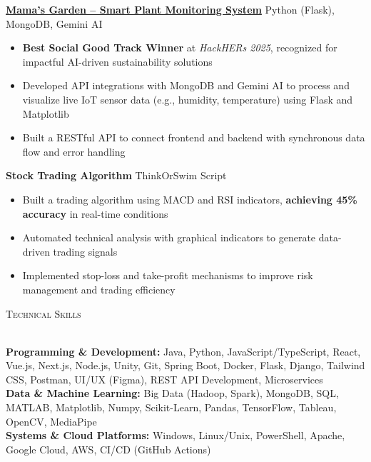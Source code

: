 \documentclass[a4paper]{article}
\newcommand{\lineunder} {
    \vspace*{-8pt} \\
    \hspace*{-18pt} \hrulefill \\
}
\newcommand{\header} [1] {
    {\hspace*{-18pt}\vspace*{6pt} \textsc{#1}}
    \vspace*{-6pt} \lineunder
}
\begin{document}
\textbf{\href{https://devpost.com/software/mama-s-garden}{Mama's Garden – Smart Plant Monitoring System}} \hfill Python (Flask), MongoDB, Gemini AI  
\vspace{-3mm}
\begin{itemize} \itemsep -4pt
    \item \textbf{Best Social Good Track Winner} at \textit{HackHERs 2025}, recognized for impactful AI-driven sustainability solutions
    \item Developed API integrations with MongoDB and Gemini AI to process and visualize live IoT sensor data (e.g., humidity, temperature) using Flask and Matplotlib
    \item Built a RESTful API to connect frontend and backend with synchronous data flow and error handling
\end{itemize}
\vspace{-1mm}

\textbf{{Stock Trading Algorithm}}  \hfill ThinkOrSwim Script \\
\vspace{-3mm}
\begin{itemize} \itemsep -4pt
  \item Built a trading algorithm using MACD and RSI indicators, \textbf{achieving 45\% accuracy} in real-time conditions
  \item Automated technical analysis with graphical indicators to generate data-driven trading signals
  \item Implemented stop-loss and take-profit mechanisms to improve risk management and trading efficiency
\end{itemize}
\vspace{-2mm}

%
%
\header{Technical Skills}
\vspace{0mm}

\textbf{Programming \& Development:} 
{\small
Java, Python, JavaScript/TypeScript, React, Vue.js, Next.js, Node.js, Unity, Git, Spring Boot, Docker, Flask, Django, Tailwind CSS, Postman, UI/UX (Figma), REST API Development, Microservices\\
}
\textbf{Data \& Machine Learning:} 
{\small
Big Data (Hadoop, Spark), MongoDB, SQL, MATLAB, Matplotlib, Numpy, Scikit-Learn, Pandas, TensorFlow, Tableau, OpenCV, MediaPipe\\
}
\textbf{Systems \& Cloud Platforms:} 
{\small
Windows, Linux/Unix, PowerShell, Apache, Google Cloud, AWS, CI/CD (GitHub Actions)
}
\end{document}
